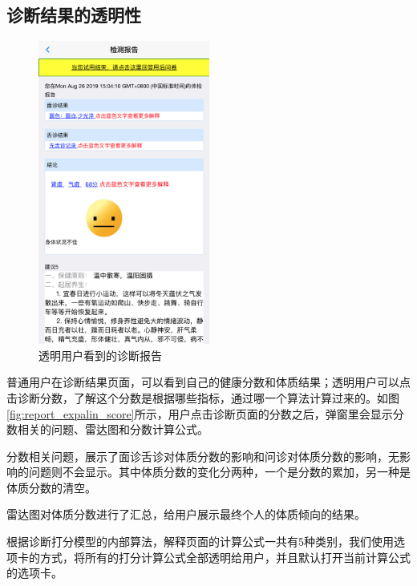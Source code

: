 \subsection{诊断结果的透明性}
\begin{figure}[ht]
    \centering
    \includegraphics[height=10cm]{images/report3.png}
    \caption{透明用户看到的诊断报告}
    \label{fig:my_label}
\end{figure}

普通用户在诊断结果页面，可以看到自己的健康分数和体质结果；透明用户可以点击诊断分数，了解这个分数是根据哪些指标，通过哪一个算法计算过来的。如图\ref{fig:report_expalin_score}所示，用户点击诊断页面的分数之后，弹窗里会显示分数相关的问题、雷达图和分数计算公式。

分数相关问题，展示了面诊舌诊对体质分数的影响和问诊对体质分数的影响，无影响的问题则不会显示。其中体质分数的变化分两种，一个是分数的累加，另一种是体质分数的清空。

雷达图对体质分数进行了汇总，给用户展示最终个人的体质倾向的结果。

根据诊断打分模型的内部算法，解释页面的计算公式一共有5种类别，我们使用选项卡的方式，将所有的打分计算公式全部透明给用户，并且默认打开当前计算公式的选项卡。

